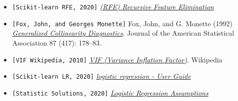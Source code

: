 \documentclass[a4paper,12pt]{article}
\begin{document}
\begin{itemize}
        \item \texttt{[Scikit-learn RFE, 2020]} \textit{\href{https://scikit-learn.org/stable/modules/generated/sklearn.feature_selection.RFE.html}{(RFE) Recursive Feature Elimination}}
        \item \texttt{[Fox, John, and Georges Monette]} Fox, John, and G. Monette (1992) \textit{\href{http://www.jstor.org/stable/2290467}{Generalized Collinearity Diagnostics}}. Journal of the American Statistical Association 87 (417): 178–83.
        \item \texttt{[VIF Wikipedia, 2010]} \textit{\href{https://en.wikipedia.org/wiki/Variance_inflation_factor}{VIF (Variance Inflation Factor)}}. Wikipedia
        \item \texttt{[Scikit-learn LR, 2020]} \textit{\href{https://scikit-learn.org/stable/modules/linear_model.html\#logistic-regression}{logistic regression - User Guide}}
        \item \texttt{[Statistic Solutions, 2020]} \textit{\href{https://www.statisticssolutions.com/assumptions-of-logistic-regression/}{Logistic Regression Assumptions}}

    \end{itemize}

\end{document}
